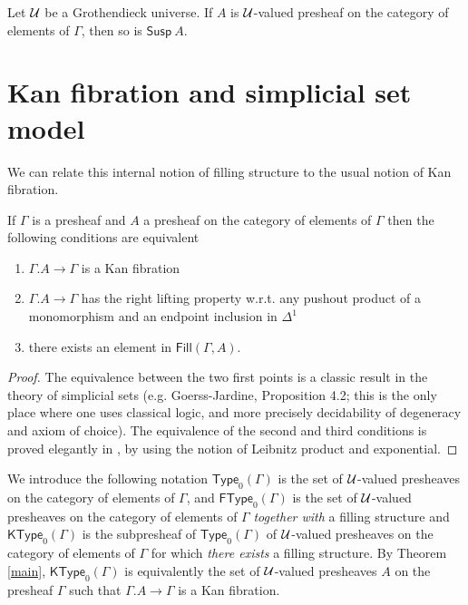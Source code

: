 \documentclass[10pt,a4paper]{article}
\newcommand{\Susp}{\mathsf{Susp}}
\newcommand{\Fill}{\mathsf{Fill}}
\def\Type{\mathsf{Type}}
\def\KType{\mathsf{KType}}
\def\FType{\mathsf{FType}}
\begin{document}
  Let ${\cal U}$ be a Grothendieck universe. If $A$ is ${\cal U}$-valued
presheaf on the category of elements of $\Gamma$, then so is
$\Susp~A$.

\section{Kan fibration and simplicial set model}

 We can relate this internal notion of filling structure to the usual
notion of Kan fibration.

\begin{theorem}\label{main}
If $\Gamma$ is a presheaf and $A$ a presheaf on the category of elements of 
$\Gamma$ then the following conditions are equivalent
\begin{enumerate}
\item $\Gamma.A\rightarrow\Gamma$ is a Kan fibration
\item $\Gamma.A\rightarrow\Gamma$ has the right lifting property w.r.t. any pushout product
of a monomorphism and an endpoint inclusion in $\Delta^1$
\item there exists an element in $\Fill(\Gamma,A)$.
\end{enumerate}
\end{theorem}

\begin{proof}
The equivalence between the two first points is a classic result in the theory
of simplicial sets (e.g. Goerss-Jardine, Proposition 4.2; this is the only place
where one uses classical logic, and more precisely decidability of degeneracy and 
axiom of choice). The equivalence
of the second and third conditions is proved elegantly in \cite{GS}, by using the
notion of Leibnitz product and exponential.
\end{proof}

 We introduce the following notation $\Type_0(\Gamma)$ is the set
of ${\cal U}$-valued presheaves on the category of elements of $\Gamma$,
and  $\FType_0(\Gamma)$ is the set
of ${\cal U}$-valued presheaves on the category of elements of $\Gamma$
{\em together with} a filling structure
and  $\KType_0(\Gamma)$ is the subpresheaf of $\Type_0(\Gamma)$
of ${\cal U}$-valued presheaves on the category of elements of $\Gamma$
for which {\em there exists} a filling structure. By Theorem \ref{main},
$\KType_0(\Gamma)$ is equivalently the set of ${\cal U}$-valued presheaves $A$ on the presheaf $\Gamma$
such that $\Gamma.A\rightarrow \Gamma$ is a Kan fibration.
\end{document}
